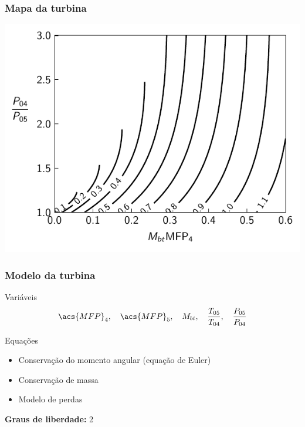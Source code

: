 \documentclass[aspectratio=1610]{beamer}
\begin{document}
\begin{frame}
    \frametitle{Mapa da turbina}
    \includegraphics{fig/turbine_map_typical}
\end{frame}

\begin{frame}
\frametitle{Modelo da turbina}

\begin{block}{Variáveis}
    \[
        \acs{MFP}_4, \quad \acs{MFP}_5, \quad M_{bt}, \quad \tr{05}{04}, \quad \pr{05}{04}
    \]
\end{block}

\vfill
    
\begin{block}{Equações}
\begin{itemize}
    \item Conservação do momento angular (equação de Euler)
    \item Conservação de massa
    \item Modelo de perdas
\end{itemize}
\end{block}
    \vfill
    \textbf{Graus de liberdade:} 2 
\end{frame}
\end{document}
